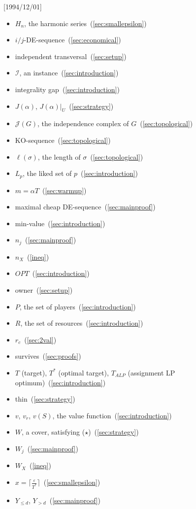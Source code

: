 \NeedsTeXFormat{LaTeX2e}[1994/12/01]\documentclass[letterpaper, 11pt]{article}
\theoremstyle{definition}
\theoremstyle{remark}
\numberwithin{equation}{section}
\newcommand{\cI}{\mathcal{I}}
\newcommand{\cJ}{\mathcal{J}}
\newcommand{\veps}{\varepsilon}
\begin{document}
\begin{itemize}
\item $H_n$, the harmonic series~(\ref{sec:smallepsilon})
\item $i/j$-DE-sequence~(\ref{sec:economical})
\item independent transversal~(\ref{sec:setup})
\item $\cI$, an instance~(\ref{sec:introduction})
\item integrality gap~(\ref{sec:introduction})
\item $J(\alpha)$, $J(\alpha)|_U$~(\ref{sec:strategy})
\item $\cJ(G)$, the independence complex of $G$~(\ref{sec:topological})
\item KO-sequence~(\ref{sec:topological})
\item $\ell(\sigma)$, the length of $\sigma$~(\ref{sec:topological})
\item $L_p$, the liked set of $p$~(\ref{sec:introduction})
\item $m=\alpha T$~(\ref{sec:warmup})
\item maximal cheap DE-sequence~(\ref{sec:mainproof})
\item min-value~(\ref{sec:introduction})
\item $n_j$~(\ref{sec:mainproof})
\item $n_X$~(\ref{ineq})
\item $OPT$~(\ref{sec:introduction})
\item owner~(\ref{sec:setup})
\item $P$, the set of players~(\ref{sec:introduction})
\item $R$, the set of resources~(\ref{sec:introduction})
\item $r_c$~(\ref{sec:2val})
\item survives~(\ref{sec:proofs})
\item $T$ (target), $T^*$ (optimal target), $T_{ALP}$ (assignment LP optimum)~(\ref{sec:introduction})
\item thin~(\ref{sec:strategy})
\item $v$, $v_r$, $v(S)$, the value function~(\ref{sec:introduction})
\item $W$, a cover, satisfying ($\star$)~(\ref{sec:strategy})
\item $W_j$~(\ref{sec:mainproof})
\item $W_X$~(\ref{ineq})
\item $x=\lceil\frac{\veps}{T^*}\rceil$~(\ref{sec:smallepsilon})
\item $Y_{\leq d}$, $Y_{>d}$~(\ref{sec:mainproof})
\end{itemize}
\end{document}

